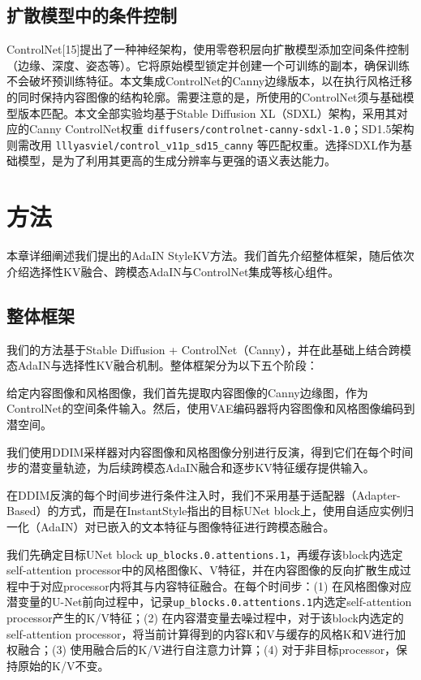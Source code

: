 \documentclass[10pt,twocolumn]{article}
\begin{document}
\subsection{扩散模型中的条件控制}

ControlNet[15]提出了一种神经架构，使用零卷积层向扩散模型添加空间条件控制（边缘、深度、姿态等）。它将原始模型锁定并创建一个可训练的副本，确保训练不会破坏预训练特征。本文集成ControlNet的Canny边缘版本，以在执行风格迁移的同时保持内容图像的结构轮廓。需要注意的是，所使用的ControlNet须与基础模型版本匹配。本文全部实验均基于Stable Diffusion XL（SDXL）架构，采用其对应的Canny ControlNet权重 \texttt{diffusers/controlnet-canny-sdxl-1.0}；SD1.5架构则需改用 \texttt{lllyasviel/control\_v11p\_sd15\_canny} 等匹配权重。选择SDXL作为基础模型，是为了利用其更高的生成分辨率与更强的语义表达能力。

\section{方法}

本章详细阐述我们提出的AdaIN StyleKV方法。我们首先介绍整体框架，随后依次介绍选择性KV融合、跨模态AdaIN与ControlNet集成等核心组件。

\subsection{整体框架}

我们的方法基于Stable Diffusion + ControlNet（Canny），并在此基础上结合跨模态AdaIN与选择性KV融合机制。整体框架分为以下五个阶段：

\medskip
{} 给定内容图像和风格图像，我们首先提取内容图像的Canny边缘图，作为ControlNet的空间条件输入。然后，使用VAE编码器将内容图像和风格图像编码到潜空间。

\medskip
{} 我们使用DDIM采样器对内容图像和风格图像分别进行反演，得到它们在每个时间步的潜变量轨迹，为后续跨模态AdaIN融合和逐步KV特征缓存提供输入。

\medskip
{} 在DDIM反演的每个时间步进行条件注入时，我们不采用基于适配器（Adapter-Based）的方式，而是在InstantStyle指出的目标UNet block上，使用自适应实例归一化（AdaIN）对已嵌入的文本特征与图像特征进行跨模态融合。

\medskip
{} 我们先确定目标UNet block \texttt{up\_blocks.0.attentions.1}，再缓存该block内选定self-attention processor中的风格图像K、V特征，并在内容图像的反向扩散生成过程中于对应processor内将其与内容特征融合。在每个时间步：(1) 在风格图像对应潜变量的U-Net前向过程中，记录\texttt{up\_blocks.0.attentions.1}内选定self-attention processor产生的K/V特征；(2) 在内容潜变量去噪过程中，对于该block内选定的self-attention processor，将当前计算得到的内容K和V与缓存的风格K和V进行加权融合；(3) 使用融合后的K/V进行自注意力计算；(4) 对于非目标processor，保持原始的K/V不变。
\end{document}
